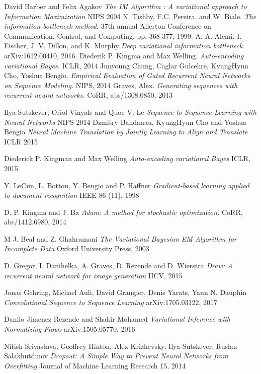 \documentclass[11pt,oneside,openright]{report}
\begin{document}
\begin{thebibliography}{9} 
David Barber and Felix Agakov
\textit{The IM Algorithm : A variational approach to Information Maximization}
NIPS 2004
N. Tishby, F.C. Pereira, and W. Biale.
\textit{The information bottleneck method}.
37th annual Allerton Conference on Communication, Control, and Computing, pp. 368-377, 1999.
A. A. Alemi, I. Fischer, J. V. Dillon, and K. Murphy
\textit{Deep variational information bottleneck}.
 arXiv:1612.00410, 2016.
 Diederik P. Kingma and Max Welling.
 \textit{Auto-encoding variational Bayes.}
  ICLR, 2014
 Junyoung Chung, Caglar Gulcehre, KyungHyun Cho, Yoshua Bengio.
 \textit{Empirical Evaluation of Gated Recurrent Neural Networks on Sequence Modeling.}
  NIPS, 2014
 Graves, Alex.
 \textit{Generating sequences with recurrent neural networks.}
 CoRR, abs/1308.0850, 2013
 
Ilya Sutskever, Oriol Vinyals and Quoc V. Le
\textit{Sequence to Sequence Learning with Neural Networks}
NIPS 2014
Dzmitry Bahdanau, KyungHyun Cho and Yoshua Bengio
\textit{Neural Machine Translation by Jointly Learning to Align and Translate}
ICLR 2015

Diederick P. Kingman and Max Welling
\textit{Auto-encoding variational Bayes}
ICLR, 2015

Y. LeCun, L. Bottou, Y. Bengio and P. Haffner
\textit{Gradient-based learning applied to document recognition}
IEEE 86 (11), 1998

D. P. Kingma and J. Ba
\textit{Adam: A method for stochastic optimization.}
 CoRR, abs/1412.6980, 2014
 
M J. Beal and Z. Ghahramani
\textit{The Variational Bayesian EM Algorithm for Incomplete Data}
Oxford University Press, 2003

D. Gregor, I. Danihelka, A. Graves, D. Rezende and D. Wierstra
\textit{Draw: A recurrent neural network for image generation}
IICV, 2015

Jonas Gehring, Michael Auli, David Grangier, Denis Yarats, Yann N. Dauphin
\textit{Convolutional Sequence to Sequence Learning}
arXiv:1705.03122, 2017

Danilo Jimenez Rezende and Shakir Mohamed
\textit{Variational Inference with Normalizing Flows}
arXiv:1505.05770, 2016

Nitish Srivastava, Geoffrey Hinton, Alex Krizhevsky, Ilya Sutskever, Ruslan Salakhutdinov
\textit{Dropout: A Simple Way to Prevent Neural Networks from Overfitting}
Journal of Machine Learning Research 15, 2014


\end{thebibliography}
\end{document}
